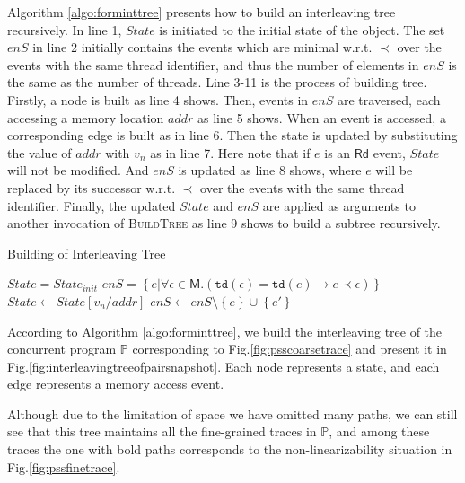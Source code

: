 \documentclass[runningheads]{llncs}
\newcommand{\eread}{\mathsf{Rd}}
\newcommand{\pair}[1]{{\langle{#1}\rangle}}
\newcommand{\set}[1]{\left\{{#1}\right\}}
\begin{document}
    Algorithm \ref{algo:forminttree} presents how to build an interleaving tree recursively. In line 1, $State$ is initiated to the initial state of the object. The set $\mathit{enS}$ in line 2 initially contains the events which are minimal w.r.t. $\prec$ over the events with the same thread identifier, and thus the number of elements in $\mathit{enS}$ is the same as the number of threads. Line 3-11 is the process of building tree. Firstly, a node is built as line 4 shows. Then, events in $\mathit{enS}$ are traversed, each accessing a memory location $addr$ as line 5 shows. When an event is accessed, a corresponding edge is built as in line 6. Then the state is updated by substituting the value of $addr$ with $v_n$ as in line 7. Here note that if $e$ is an $\eread$ event, $State$ will not be modified. And $\mathit{enS}$ is updated as line 8 shows, where $e$ will be replaced by its successor w.r.t. $\prec$ over the events with the same thread identifier. Finally, the updated $\mathit{State}$ and $\mathit{enS}$ are applied as arguments to another invocation of \textsc{BuildTree} as line 9 shows to build a subtree recursively.

\vspace{-0.5cm}

\begin{algorithm}
    \caption{Building of Interleaving Tree}\label{algo:forminttree}
    \begin{algorithmic}[1]
        \State $\mathit{State} = \mathit{State}_{init}$
        \State $\mathit{enS} = \left\{ e | \forall \epsilon\in \mathsf{M} .(\mathtt{td}(\epsilon)=\mathtt{td}(e)\longrightarrow e\prec \epsilon)\right\}$
            \State {}
            \For{$e(addr,v_n)^{\pair{o,t}} \leftarrow \mathit{enS}$}
                \State {}
                \State $\mathit{State} \gets \mathit{State[v_n/addr]}$
                \State $\mathit{enS} \gets \mathit{enS}\setminus \set{e} \cup \set{e'}$
                \State {}
            \EndFor
        \EndFunction
    \end{algorithmic}
\end{algorithm}

\vspace{-0.5cm}
\begin{example} 
According to Algorithm \ref{algo:forminttree}, we build the interleaving tree of the concurrent program $\mathbb{P}$ corresponding to Fig.\ref{fig:psscoarsetrace} and present it in Fig.\ref{fig:interleavingtreeofpairsnapshot}. Each node represents a state, and each edge represents a memory access event.

Although due to the limitation of space we have omitted many paths, we can still see that this tree maintains all the fine-grained traces in $\mathbb{P}$, and among these traces the one with bold paths corresponds to 
the non-linearizability situation in Fig.\ref{fig:pssfinetrace}.
\end{example}
\end{document}
